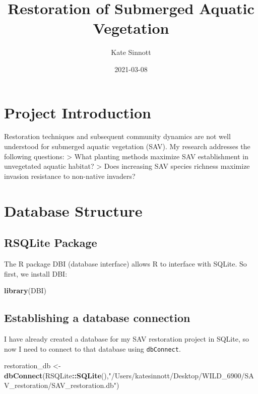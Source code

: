 \documentclass[
]{book}
\title{Restoration of Submerged Aquatic Vegetation}
\author{Kate Sinnott}
\date{2021-03-08}
\newenvironment{Shaded}{\begin{snugshade}}{\end{snugshade}}
\newcommand{\KeywordTok}[1]{\textcolor[rgb]{0.13,0.29,0.53}{\textbf{#1}}}
\newcommand{\NormalTok}[1]{#1}
\newcommand{\OperatorTok}[1]{\textcolor[rgb]{0.81,0.36,0.00}{\textbf{#1}}}
\newcommand{\StringTok}[1]{\textcolor[rgb]{0.31,0.60,0.02}{#1}}
\begin{document}
\maketitle

{
\setcounter{tocdepth}{1}
\tableofcontents
}
\hypertarget{project-introduction}{%
\chapter{Project Introduction}\label{project-introduction}}

Restoration techniques and subsequent community dynamics are not well understood for submerged aquatic vegetation (SAV). My research addresses the following questions:
\textgreater{} What planting methods maximize SAV establishment in unvegetated aquatic habitat?
\textgreater{} Does increasing SAV species richness maximize invasion resistance to non-native invaders?

\hypertarget{database-structure}{%
\chapter{Database Structure}\label{database-structure}}

\hypertarget{rsqlite-package}{%
\section{RSQLite Package}\label{rsqlite-package}}

The R package DBI (database interface) allows R to interface with SQLite. So first,
we install DBI:

\begin{Shaded}
\begin{Highlighting}[]
\KeywordTok{library}\NormalTok{(DBI)}
\end{Highlighting}
\end{Shaded}

\hypertarget{establishing-a-database-connection}{%
\section{Establishing a database connection}\label{establishing-a-database-connection}}

I have already created a database for my SAV restoration project in SQLite,
so now I need to connect to that database using \texttt{dbConnect}.

\begin{Shaded}
\begin{Highlighting}[]
\NormalTok{restoration_db <-}\StringTok{ }\KeywordTok{dbConnect}\NormalTok{(RSQLite}\OperatorTok{::}\KeywordTok{SQLite}\NormalTok{(),}\StringTok{"/Users/katesinnott/Desktop/WILD_6900/SAV_restoration/SAV_restoration.db"}\NormalTok{)}
\end{Highlighting}
\end{Shaded}
\end{document}
